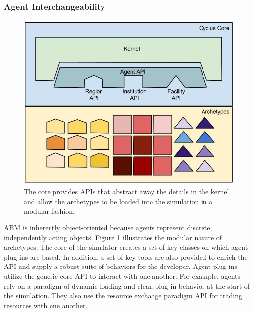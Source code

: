 \subsubsection{Agent Interchangeability}\label{sec:interchangeability}


\begin{figure}[htbp!]
\begin{center}
\includegraphics[width=\textwidth]{./images/framework}
\end{center}
\caption{The \Cyclus core provides \gls{API}s that abstract away the details in 
the kernel and allow the archetypes to be loaded into the simulation in a modular 
fashion.}
\label{fig:framework}
\end{figure}

\gls{ABM} is inherently object-oriented because agents represent 
discrete, independently acting objects.  Figure \ref{fig:framework} illustrates
the modular nature of \Cyclus archetypes.  The core of the \Cyclus simulator 
creates a set of key classes on which agent plug-ins 
are based. In addition, a set of key tools are also provided to enrich the 
\gls{API} and supply a robust suite of behaviors for the developer. 
Agent plug-ins utilize the generic core \gls{API} to interact with one another.  For 
example, agents rely on a paradigm of dynamic loading and clean plug-in 
behavior at the start of the simulation. They also use the resource exchange 
paradigm \gls{API} for trading resources with one another. 

